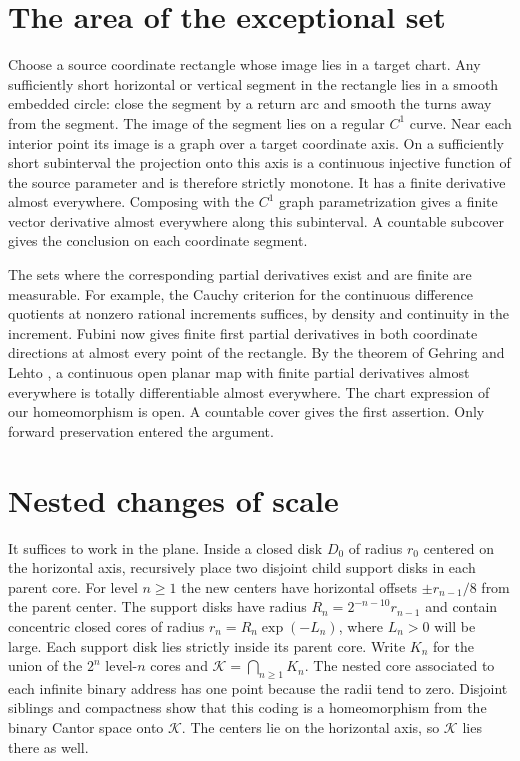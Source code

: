\documentclass[11pt,a4paper]{amsart}
\newcommand{\Cset}{\mathcal K}
\begin{document}
\section{The area of the exceptional set}
Choose a source coordinate rectangle whose image lies in a target chart. Any sufficiently short horizontal or vertical segment in the rectangle lies in a smooth embedded circle: close the segment by a return arc and smooth the turns away from the segment. The image of the segment lies on a regular \(C^1\) curve. Near each interior point its image is a graph over a target coordinate axis. On a sufficiently short subinterval the projection onto this axis is a continuous injective function of the source parameter and is therefore strictly monotone. It has a finite derivative almost everywhere. Composing with the \(C^1\) graph parametrization gives a finite vector derivative almost everywhere along this subinterval. A countable subcover gives the conclusion on each coordinate segment.

The sets where the corresponding partial derivatives exist and are finite are measurable. For example, the Cauchy criterion for the continuous difference quotients at nonzero rational increments suffices, by density and continuity in the increment. Fubini now gives finite first partial derivatives in both coordinate directions at almost every point of the rectangle. By the theorem of Gehring and Lehto \cite{gehringlehto}, a continuous open planar map with finite partial derivatives almost everywhere is totally differentiable almost everywhere. The chart expression of our homeomorphism is open. A countable cover gives the first assertion. Only forward preservation entered the argument.

\section{Nested changes of scale}
It suffices to work in the plane. Inside a closed disk \(D_0\) of radius \(r_0\) centered on the horizontal axis, recursively place two disjoint child support disks in each parent core. For level \(n\ge1\) the new centers have horizontal offsets \(\pm r_{n-1}/8\) from the parent center. The support disks have radius \(R_n=2^{-n-10}r_{n-1}\) and contain concentric closed cores of radius \(r_n=R_n\exp(-L_n)\), where \(L_n>0\) will be large. Each support disk lies strictly inside its parent core. Write \(K_n\) for the union of the \(2^n\) level-\(n\) cores and \(\Cset=\bigcap_{n\ge1}K_n\). The nested core associated to each infinite binary address has one point because the radii tend to zero. Disjoint siblings and compactness show that this coding is a homeomorphism from the binary Cantor space onto \(\Cset\). The centers lie on the horizontal axis, so \(\Cset\) lies there as well.
\end{document}
